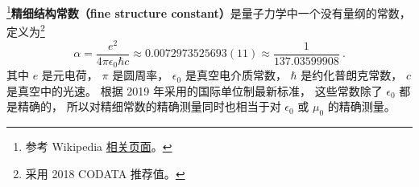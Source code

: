 
\begin{issues}
\issueTODO
\end{issues}


\footnote{参考 Wikipedia \href{https://en.wikipedia.org/wiki/Fine-structure_constant}{相关页面}。}\textbf{精细结构常数（fine structure constant）}是量子力学中一个没有量纲的常数， 定义为\footnote{采用 2018 CODATA 推荐值。}
\begin{equation}\label{eq_FinStr_1}
\alpha = \frac{e^2}{4\pi\epsilon_0\hbar c} \approx 0.0072973525693(11) \approx \frac{1}{137.03599908}~.
\end{equation}
其中 $e$ 是元电荷， $\pi$ 是圆周率， $\epsilon_0$ 是真空电介质常数， $\hbar$ 是约化普朗克常数， $c$ 是真空中的光速。 %
根据 2019 年采用的国际单位制最新标准， 这些常数除了 $\epsilon_0$ 都是精确的， 所以对精细常数的精确测量同时也相当于对 $\epsilon_0$ 或 $\mu_0$ 的精确测量。
